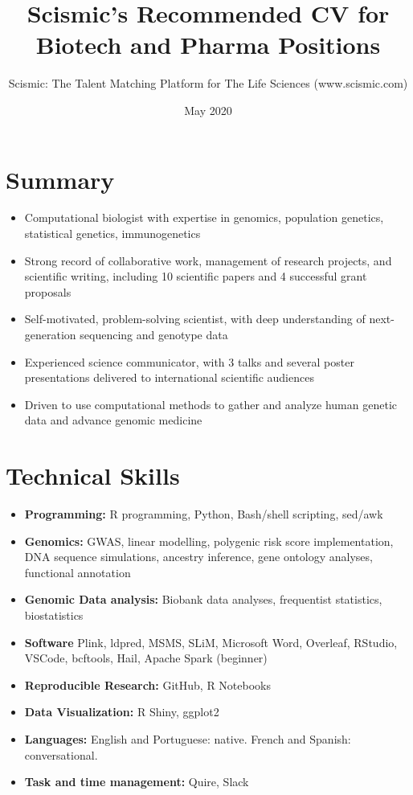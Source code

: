 \documentclass{article}
\title{Scismic's Recommended CV for Biotech and Pharma Positions}
\author{Scismic: The Talent Matching Platform for The Life Sciences (www.scismic.com)}
\date{May 2020}
\begin{document}
\makecvtitle %
\section{Summary}
\begin{itemize}
\item Computational biologist with expertise in genomics, population genetics, statistical genetics, immunogenetics
\item Strong record of collaborative work, management of research projects, and scientific writing, including 10 scientific papers and 4 successful grant proposals
\item Self-motivated, problem-solving scientist, with deep understanding of next-generation sequencing and genotype data
\item Experienced science communicator, with 3 talks and several poster presentations delivered to international scientific audiences 
\item Driven to use computational methods to gather and analyze human genetic data and advance genomic medicine

\end{itemize}
 
\section{Technical Skills}


\begin{itemize}
\item \textbf{Programming:} R programming, Python, Bash/shell scripting, sed/awk
\item \textbf{Genomics:} GWAS, linear modelling, polygenic risk score implementation, DNA sequence simulations, ancestry inference, gene ontology analyses, functional annotation
\item \textbf{Genomic Data analysis:} Biobank data analyses, frequentist statistics, biostatistics
\item \textbf{Software} Plink, ldpred, MSMS, SLiM, Microsoft Word, Overleaf, RStudio, VSCode, bcftools, Hail, Apache Spark (beginner)
\item \textbf{Reproducible Research:} GitHub, R Notebooks
\item \textbf{Data Visualization:} R Shiny, ggplot2
\item \textbf{Languages:} English and Portuguese: native. French and Spanish: conversational.
\item \textbf{Task and time management:} Quire, Slack
\end{itemize}
 
\end{document}
